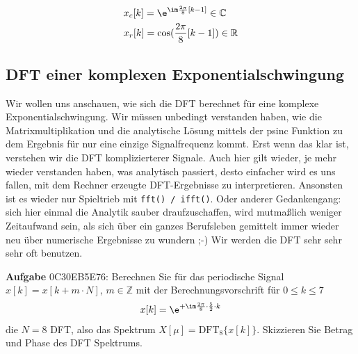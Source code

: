 \begin{Loesung}
\begin{align}
&x_c[k] = \e^{\im \frac{2\pi}{8} [k -1] } \in\mathbb{C}\\
&x_r[k] = \cos(\frac{2\pi}{8} [k-1]) \in\mathbb{R}
\end{align}
\end{Loesung}




















\newpage
\subsection{DFT einer komplexen Exponentialschwingung}
\label{sec:0C30EB5E76}
\begin{Ziel}
Wir wollen uns anschauen, wie sich die DFT berechnet für eine komplexe
Exponentialschwingung. Wir müssen unbedingt verstanden haben, wie die
Matrixmultiplikation und die analytische Lösung mittels der psinc Funktion
zu dem Ergebnis für nur eine einzige Signalfrequenz kommt. Erst wenn das
klar ist, verstehen wir die DFT komplizierterer Signale. Auch hier gilt
wieder, je mehr wieder verstanden haben, was analytisch passiert, desto einfacher
wird es uns fallen, mit dem Rechner erzeugte DFT-Ergebnisse zu interpretieren.
Ansonsten ist es wieder nur Spieltrieb mit \texttt{fft() / ifft()}.
%
Oder anderer Gedankengang: sich hier einmal die Analytik sauber draufzuschaffen,
wird mutmaßlich weniger Zeitaufwand sein, als sich über ein ganzes Berufsleben
gemittelt immer wieder neu über numerische Ergebnisse zu wundern ;-) Wir werden
die DFT sehr sehr sehr oft benutzen.
\end{Ziel}
\textbf{Aufgabe} {\tiny 0C30EB5E76}: Berechnen Sie für das periodische
Signal $x[k]=x[k+m \cdot N]$, $m\in\mathbb{Z}$
mit der Berechnungsvorschrift für $0\leq k \leq 7$
\begin{align}
x[k] = \e^{+\im \frac{2\pi}{8} \cdot \frac{5}{2} \cdot k}
\end{align}
die $N=8$ DFT, also das Spektrum $X[\mu] = \mathrm{DFT}_8\{x[k]\}$.
%
Skizzieren Sie Betrag und Phase des DFT Spektrums.


